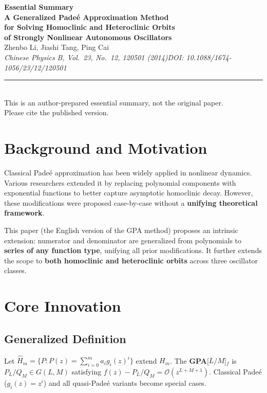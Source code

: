 \documentclass[11pt,a4paper]{article}
\begin{document}
\begin{center}
{\LARGE\bfseries\color{primary}Essential Summary}\\[12pt]
{\large\bfseries A Generalized Pade\'{e} Approximation Method\\for Solving Homoclinic and Heteroclinic Orbits\\of Strongly Nonlinear Autonomous Oscillators}\\[8pt]
{\normalsize Zhenbo Li, Jiashi Tang, Ping Cai}\\[4pt]
{\small\itshape Chinese Physics B, Vol.\ 23, No.\ 12, 120501 (2014)\quad DOI: 10.1088/1674-1056/23/12/120501}\\[6pt]
{\small\rule{0.7\textwidth}{0.5pt}}\\[4pt]
{\small\color{accent}This is an author-prepared essential summary, not the original paper.\\Please cite the published version.}
\end{center}

\vspace{0.5em}

\section{Background and Motivation}

Classical Pade\'{e} approximation has been widely applied in nonlinear dynamics. Various researchers extended it by replacing polynomial components with exponential functions to better capture asymptotic homoclinic decay. However, these modifications were proposed case-by-case without a \textbf{unifying theoretical framework}.

This paper (the English version of the GPA method) proposes an intrinsic extension: numerator and denominator are generalized from polynomials to \textbf{series of any function type}, unifying all prior modifications. It further extends the scope to \textbf{both homoclinic and heteroclinic orbits} across three oscillator classes.

\section{Core Innovation}

\subsection{Generalized Definition}

Let $\widehat{H}_m = \{P: P(z)=\sum_{i=0}^m a_i g_i(z)^i\}$ extend $H_m$. The \textbf{GPA}[$L/M$]$_f$ is $P_L/Q_M\in G(L,M)$ satisfying $f(z) - P_L/Q_M = \mathcal{O}(z^{L+M+1})$. Classical Pade\'{e} ($g_i(z)=z^i$) and all quasi-Pade\'{e} variants become special cases.
\end{document}
